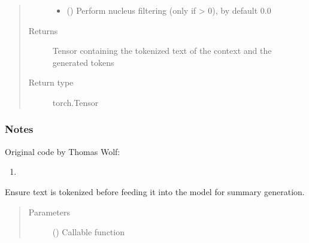 \documentclass[letterpaper,10pt,english]{sphinxmanual}
\begin{document}
\begin{fulllineitems}
\begin{fulllineitems}
\begin{quote}
\begin{description}
\begin{itemize}
\item {} 
\sphinxAtStartPar
{} (\sphinxstyleliteralemphasis{\sphinxupquote{, }}) \textendash{} Perform nucleus filtering (only if  \textgreater{} 0), by default 0.0

\end{itemize}

\item[{Returns}] \leavevmode
\sphinxAtStartPar
Tensor containing the tokenized text of the context and the generated tokens

\item[{Return type}] \leavevmode
\sphinxAtStartPar
torch.Tensor

\end{description}\end{quote}
\subsubsection*{Notes}

\sphinxAtStartPar
Original code by Thomas Wolf:
\begin{enumerate}
%
\item {} 
\sphinxAtStartPar
{}

\end{enumerate}

\end{fulllineitems}


\begin{fulllineitems}
\label{\detokenize{code:gpt2_summarizer.GPT2Summarizer.tokenize_input}}
\sphinxAtStartPar
Ensure text is tokenized before feeding it into the model for summary generation.
\begin{quote}\begin{description}
\item[{Parameters}] \leavevmode
\sphinxAtStartPar
{} () \textendash{} Callable function


\end{description}
\end{quote}
\end{fulllineitems}
\end{fulllineitems}
\end{document}
